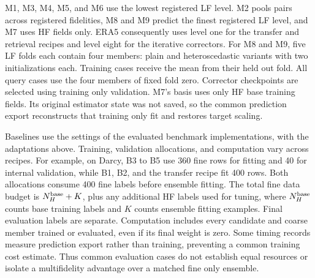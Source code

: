 M1, M3, M4, M5, and M6 use the lowest registered LF level. M2 pools pairs
across registered fidelities, M8 and M9 predict the finest registered LF
level, and M7 uses HF fields only. ERA5 consequently uses level one for the
transfer and retrieval recipes and level eight for the iterative correctors.
For M8 and M9, five LF folds each contain four members: plain and
heteroscedastic variants with two initializations each. Training cases receive
the mean from their held out fold. All query cases use the four members of
fixed fold zero. Corrector checkpoints are selected using training only
validation. M7's basis uses only HF base training fields. Its original estimator
state was not saved, so the common prediction export reconstructs that training
only fit and restores target scaling.

Baselines use the settings of the evaluated benchmark implementations, with
the adaptations above. Training, validation allocations, and computation vary
across recipes. For example, on Darcy, B3 to B5 use 360 fine rows for fitting
and 40 for internal validation, while B1, B2, and the transfer recipe fit
400 rows. Both allocations consume 400 fine labels before ensemble fitting.
The total fine data budget is $N_H^{\rm base}+K$, plus any additional HF labels
used for tuning, where $N_H^{\rm base}$ counts base training labels and $K$
counts ensemble fitting examples. Final evaluation labels are separate.
Computation includes every candidate and coarse member trained or evaluated,
even if its final weight is zero. Some timing records measure prediction
export rather than training, preventing a common training cost estimate.
Thus common evaluation cases do not establish equal resources or isolate a
multifidelity advantage over a matched fine only ensemble.

